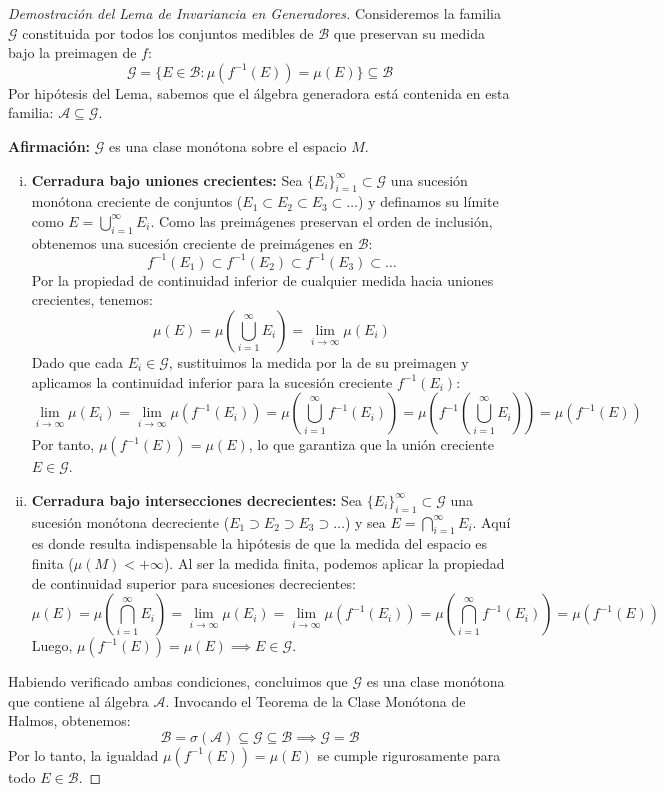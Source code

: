 \begin{proof}[Demostración del Lema de Invariancia en Generadores]
	Consideremos la familia $\mathcal{G}$ constituida por todos los conjuntos medibles de $\mathcal{B}$ que preservan su medida bajo la preimagen de $f$:
	$$ \mathcal{G} = \{ E \in \mathcal{B} : \mu(f^{-1}(E)) = \mu(E) \} \subseteq \mathcal{B} $$
	Por hipótesis del Lema, sabemos que el álgebra generadora está contenida en esta familia: $\mathcal{A} \subseteq \mathcal{G}$. 
	
	\textbf{Afirmación:} $\mathcal{G}$ es una clase monótona sobre el espacio $M$.
	\begin{enumerate}[i)]
		\item \textbf{Cerradura bajo uniones crecientes:} Sea $\{E_i\}_{i=1}^\infty \subset \mathcal{G}$ una sucesión monótona creciente de conjuntos ($E_1 \subset E_2 \subset E_3 \subset \dots$) y definamos su límite como $E = \bigcup_{i=1}^\infty E_i$.
		Como las preimágenes preservan el orden de inclusión, obtenemos una sucesión creciente de preimágenes en $\mathcal{B}$:
		$$ f^{-1}(E_1) \subset f^{-1}(E_2) \subset f^{-1}(E_3) \subset \dots $$
		Por la propiedad de continuidad inferior de cualquier medida hacia uniones crecientes, tenemos:
		$$ \mu(E) = \mu\left( \bigcup_{i=1}^\infty E_i \right) = \lim_{i \to \infty} \mu(E_i) $$
		Dado que cada $E_i \in \mathcal{G}$, sustituimos la medida por la de su preimagen y aplicamos la continuidad inferior para la sucesión creciente $f^{-1}(E_i)$:
		$$ \lim_{i \to \infty} \mu(E_i) = \lim_{i \to \infty} \mu(f^{-1}(E_i)) = \mu\left( \bigcup_{i=1}^\infty f^{-1}(E_i) \right) = \mu\left( f^{-1}\left( \bigcup_{i=1}^\infty E_i \right) \right) = \mu(f^{-1}(E)) $$
		Por tanto, $\mu(f^{-1}(E)) = \mu(E)$, lo que garantiza que la unión creciente $E \in \mathcal{G}$.
		
		\item \textbf{Cerradura bajo intersecciones decrecientes:} Sea $\{E_i\}_{i=1}^\infty \subset \mathcal{G}$ una sucesión monótona decreciente ($E_1 \supset E_2 \supset E_3 \supset \dots$) y sea $E = \bigcap_{i=1}^\infty E_i$.
		Aquí es donde resulta indispensable la hipótesis de que la medida del espacio es finita ($\mu(M) < +\infty$). Al ser la medida finita, podemos aplicar la propiedad de continuidad superior para sucesiones decrecientes:
		$$ \mu(E) = \mu\left( \bigcap_{i=1}^\infty E_i \right) = \lim_{i \to \infty} \mu(E_i) = \lim_{i \to \infty} \mu(f^{-1}(E_i)) = \mu\left( \bigcap_{i=1}^\infty f^{-1}(E_i) \right) = \mu(f^{-1}(E)) $$
		Luego, $\mu(f^{-1}(E)) = \mu(E) \implies E \in \mathcal{G}$.
	\end{enumerate}
	Habiendo verificado ambas condiciones, concluimos que $\mathcal{G}$ es una clase monótona que contiene al álgebra $\mathcal{A}$. Invocando el Teorema de la Clase Monótona de Halmos, obtenemos:
	$$ \mathcal{B} = \sigma(\mathcal{A}) \subseteq \mathcal{G} \subseteq \mathcal{B} \implies \mathcal{G} = \mathcal{B} $$
	Por lo tanto, la igualdad $\mu(f^{-1}(E)) = \mu(E)$ se cumple rigurosamente para todo $E \in \mathcal{B}$.
\end{proof}


